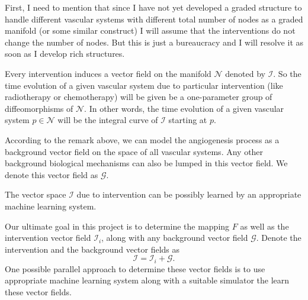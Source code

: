 \begin{observation}
	First, I need to mention that since I have not yet developed a graded structure to handle different vascular systems with different total number of nodes as a graded manifold (or some similar construct) I will assume that the interventions do not change the number of nodes. But this is just a bureaucracy and I will resolve it as soon as I develop rich structures. 
	
	Every intervention induces a vector field on the manifold $ \mathcal{N} $ denoted by $ \mathcal{I} $. So the time evolution of a given vascular system due to particular intervention (like radiotherapy or chemotherapy) will be given be a one-parameter group of diffeomorphisms of $ \mathcal{N} $. In other words, the time evolution of a given vascular system $ p \in \mathcal{N} $ will be the integral curve of $ \mathcal{I} $ starting at $ p $.
\end{observation}
\begin{remark}
	According to the remark above, we can model the angiogenesis process as a background vector field on the space of all vascular systems. Any other background biological mechanisms can also be lumped in this vector field. We denote this vector field as $ \mathcal{G} $.
\end{remark}
\begin{remark}
	The vector space $ \mathcal{I} $ due to intervention can be possibly learned by an appropriate machine learning system.
\end{remark}

\begin{openQuestion}
	Our ultimate goal in this project is to determine the mapping $ F $ as well as the intervention vector field $ \mathcal{I}_i $, along with any background vector field $ \mathcal{G} $. Denote the intervention and the background vector fields as 
	\[ \mathcal{I} = \mathcal{I}_i + \mathcal{G}. \]
	One possible parallel approach to determine these vector fields is to use appropriate machine learning system along with a suitable simulator the learn these vector fields.
\end{openQuestion}

